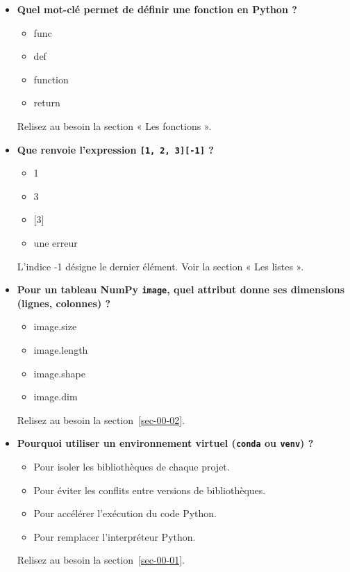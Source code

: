 \documentclass[
  french,
  11pt,
  letterpaper,
  open=any,
  twoside=false,
  french]{scrbook}
\providecommand{\tightlist}{%
  \setlength{\itemsep}{0pt}\setlength{\parskip}{0pt}}
\begin{document}
\begin{itemize}
  Relisez au besoin la section « Les listes ».
\item
  \textbf{Quel mot-clé permet de définir une fonction en Python ?}

  \begin{itemize}
  \tightlist
  \item
    func
  \item
    def
  \item
    function
  \item
    return
  \end{itemize}

  Relisez au besoin la section « Les fonctions ».
\item
  \textbf{Que renvoie l'expression \texttt{{[}1,\ 2,\ 3{]}{[}-1{]}} ?}

  \begin{itemize}
  \tightlist
  \item
    1
  \item
    3
  \item
    {[}3{]}
  \item
    une erreur
  \end{itemize}

  L'indice -1 désigne le dernier élément. Voir la section « Les listes
  ».
\item
  \textbf{Pour un tableau NumPy \texttt{image}, quel attribut donne ses
  dimensions (lignes, colonnes) ?}

  \begin{itemize}
  \tightlist
  \item
    image.size
  \item
    image.length
  \item
    image.shape
  \item
    image.dim
  \end{itemize}

  Relisez au besoin la section~\ref{sec-00-02}.
\item
  \textbf{Pourquoi utiliser un environnement virtuel (\texttt{conda} ou
  \texttt{venv}) ?}

  \begin{itemize}
  \tightlist
  \item
    Pour isoler les bibliothèques de chaque projet.
  \item
    Pour éviter les conflits entre versions de bibliothèques.
  \item
    Pour accélérer l'exécution du code Python.
  \item
    Pour remplacer l'interpréteur Python.
  \end{itemize}

  Relisez au besoin la section~\ref{sec-00-01}.
\end{itemize}
\end{document}
